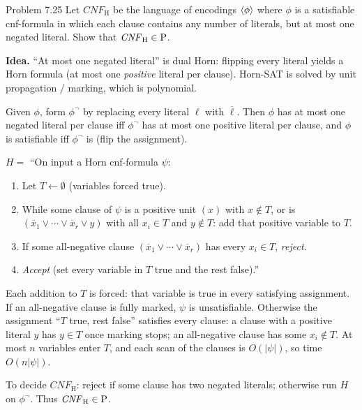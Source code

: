 \begin{question}{Problem 7.25}
Let $\mathit{CNF}_{\mathrm{H}}$ be the language of encodings $\langle \phi\rangle$ where $\phi$ is a satisfiable cnf-formula in which each clause contains any number of literals, but at most one negated literal. Show that $\mathit{CNF}_{\mathrm{H}}\in\mathrm{P}$.
\end{question}
\begin{soln}
\textbf{Idea.} ``At most one negated literal'' is dual Horn: flipping every literal yields a Horn formula (at most one \emph{positive} literal per clause). Horn-SAT is solved by unit propagation / marking, which is polynomial.

Given $\phi$, form $\phi^\neg$ by replacing every literal $\ell$ with $\overline{\ell}$. Then $\phi$ has at most one negated literal per clause iff $\phi^\neg$ has at most one positive literal per clause, and $\phi$ is satisfiable iff $\phi^\neg$ is (flip the assignment).

$H=$ ``On input a Horn cnf-formula $\psi$:
\begin{enumerate}
\item Let $T\leftarrow\emptyset$ (variables forced true).
\item While some clause of $\psi$ is a positive unit $(x)$ with $x\notin T$, or is $(\overline{x}_1\lor\cdots\lor\overline{x}_r\lor y)$ with all $x_i\in T$ and $y\notin T$: add that positive variable to $T$.
\item If some all-negative clause $(\overline{x}_1\lor\cdots\lor\overline{x}_r)$ has every $x_i\in T$, \emph{reject}.
\item \emph{Accept} (set every variable in $T$ true and the rest false).''
\end{enumerate}

Each addition to $T$ is forced: that variable is true in every satisfying assignment. If an all-negative clause is fully marked, $\psi$ is unsatisfiable. Otherwise the assignment ``$T$ true, rest false'' satisfies every clause: a clause with a positive literal $y$ has $y\in T$ once marking stops; an all-negative clause has some $x_i\notin T$. At most $n$ variables enter $T$, and each scan of the clauses is $O(|\psi|)$, so time $O(n|\psi|)$.

To decide $\mathit{CNF}_{\mathrm{H}}$: reject if some clause has two negated literals; otherwise run $H$ on $\phi^\neg$. Thus $\mathit{CNF}_{\mathrm{H}}\in\mathrm{P}$.
\end{soln}

